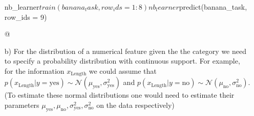 \begin{enumerate}[a)]
    nb_learner$train(banana_task, row_ids=1:8)
    
    nb_learner$predict(banana_task, row_ids = 9)
    
    @

  \item[b)]
    For the distribution of a numerical feature given the the category we need to specify a probability distribution with continuous support.
    For example, for the information $x_\text{Length}$ we could assume that $p(x_\text{Length} | y = \text{yes}) \sim \mathcal{N}(\mu_\text{yes},\sigma^2_\text{yes})$ and $p(x_\text{Length} | y = \text{no}) \sim \mathcal{N}(\mu_\text{no},\sigma^2_\text{no})$. (To estimate these normal distributions one would need to estimate their parameters $\mu_\text{yes},\mu_\text{no},\sigma^2_\text{yes},\sigma^2_\text{no}$ on the data respectively)
\end{enumerate}
